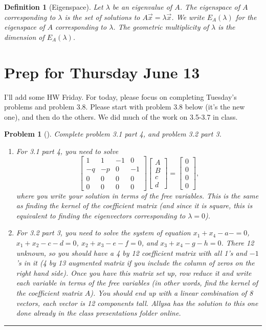 \documentclass[letterpaper,oneside]{book}%
\theoremstyle{plain}
\theoremstyle{box}
\newtheorem{definition}[theorem]{Definition}
\theoremstyle{problem}
\newtheorem{problemnum}{Problem}[chapter]
\newtheorem*{hwenum*}{Home Work Practice}
\newenvironment{problem}[1][]{\begin{problemnum}[#1]}{\end{problemnum}\nopagebreak\hrule\bigskip}
\newenvironment{hw*}[1][]{\begin{hwenum*}[#1]}{\end{hwenum*}\nopagebreak\hrule\bigskip}
\newcommand{\bvec}[1]{\begin{bmatrix} #1 \end{bmatrix}}
\begin{document}
\begin{definition}[Eigenspace]
 Let $\lambda$ be an eigenvalue of $A$.  The eigenspace of $A$ corresponding to $\lambda$ is the set of solutions to $A\vec x = \lambda \vec x$.  We write $E_A(\lambda)$ for the eigenspace of $A$ corresponding to $\lambda$. The geometric multiplicity of $\lambda$ is the dimension of $E_A(\lambda)$.  
\end{definition}





\section{Prep for Thursday June 13}


\begin{hw*}
 I'll add some HW Friday. For today, please focus on completing Tuesday's problems and problem 3.8.  Please start with problem 3.8 below (it's the new one), and then do the others. We did much of the work on 3.5-3.7 in class.  
\end{hw*}


\begin{problem}
 Complete problem 3.1 part 4, and problem 3.2 part 3.  
 \begin{enumerate}
  \item For 3.1 part 4, you need to solve 
$$\bvec{
1 & 1 & -1& 0 \\
-q &-p & 0 & -1\\
0 & 0 & 0 & 0\\
0 & 0 & 0 & 0
}\bvec{A\\B\\c\\d}=\bvec{0\\0\\0\\0},$$
where you write your solution in terms of the free variables.  
This is the same as finding the kernel of the coefficient matrix (and since it is square, this is equivalent to finding the eigenvectors corresponding to $\lambda = 0$).
\item For 3.2 part 3, you need to solve the system of equation $x_1+x_4-a-=0$, $x_1+x_2-c-d=0$, $x_2+x_3-e-f=0$, and $x_3+x_4-g-h=0$.  There 12 unknown, so you should have a 4 by 12 coefficient matrix with all 1's and $-1$'s in it (4 by 13 augmented matrix if you include the column of zeros on the right hand side).  Once you have this matrix set up, row reduce it and write each variable in terms of the free variables (in other words, find the kernel of the coefficient matrix $A$).  You should end up with a linear combination of 8 vectors, each vector is 12 components tall. Allysa has the solution to this one done already in the class presentations folder online.
\end{enumerate}

\end{problem}
\end{document}
